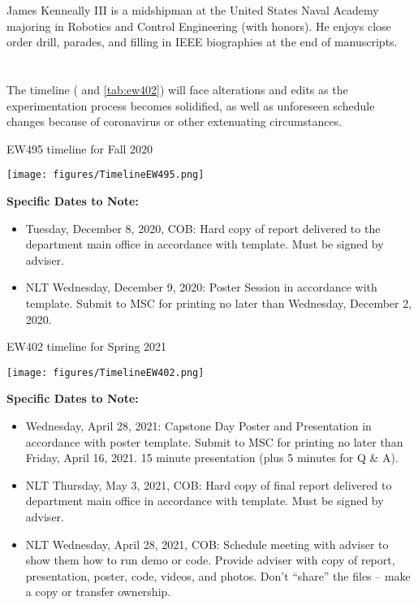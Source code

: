 \documentclass[]{IEEEtran}
\begin{document}

\begin{IEEEbiography}{James Kenneally III} is a midshipman at the United States Naval Academy majoring in Robotics and Control Engineering (with honors). He enjoys close order drill, parades, and filling in IEEE biographies at the end of manuscripts.  
\end{IEEEbiography}


\appendices
\section{}
\label{app:A}
The timeline ( and \ref{tab:ew402}) will face alterations and edits as the experimentation process becomes solidified, as well as unforeseen schedule changes because of coronavirus or other extenuating circumstances.

\begin{table*}
\caption{EW495 timeline for Fall 2020}
\label{tab:ew495}
\begin{center}
\texttt{[image: figures/TimelineEW495.png]}
\end{center}
\noindent\textbf{Specific Dates to Note:}
\begin{itemize}
\item Tuesday, December 8, 2020, COB:  Hard copy of report delivered to the department main office in accordance with template. Must be signed by adviser. 
\item NLT Wednesday, December 9, 2020: Poster Session in accordance with template.  Submit to MSC for printing no later than Wednesday, December 2, 2020.
\end{itemize}
\end{table*}

\begin{table*}
\caption{EW402 timeline for Spring 2021}
\label{tab:ew402}
\begin{center}
\texttt{[image: figures/TimelineEW402.png]}
\end{center}
\noindent\textbf{Specific Dates to Note:}
\begin{itemize}
\item Wednesday, April 28, 2021:  Capstone Day Poster and Presentation in accordance with poster template.  Submit to MSC for printing no later than Friday, April 16, 2021.  15 minute presentation (plus 5 minutes for Q \& A). 
\item NLT Thursday, May 3, 2021, COB:  Hard copy of final report delivered to department main office in accordance with template. Must be signed by adviser. 
\item NLT Wednesday, April 28, 2021, COB:  Schedule meeting with adviser to show them how to run demo or code. Provide adviser with copy of report, presentation, poster, code, videos, and photos.   Don’t ``share'' the files -- make a copy or transfer ownership.  
\end{itemize}
\end{table*}
\end{document}
